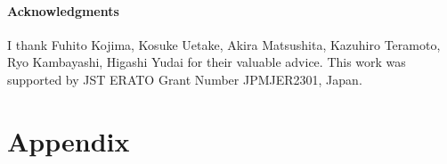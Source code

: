 \documentclass[12pt]{article}
\begin{document}
\paragraph{Acknowledgments}
I thank Fuhito Kojima, Kosuke Uetake, Akira Matsushita, Kazuhiro Teramoto, Ryo Kambayashi, Higashi Yudai for their valuable advice. This work was supported by JST ERATO Grant Number JPMJER2301, Japan.





\newpage

\appendix
\section{Appendix}\label{sec:year_data}


\end{document}
